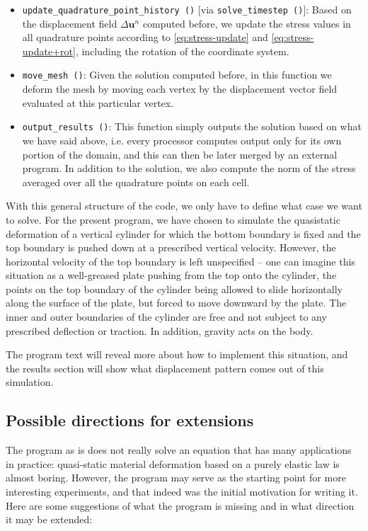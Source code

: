 \documentclass{article}
\renewcommand{\vec}[1]{\mathbf{#1}}
\begin{document}
\begin{itemize}
\item \texttt{update\_quadrature\_point\_history ()} [via
  \texttt{solve\_timestep ()}]: Based on the displacement field $\Delta \vec
  u^n$ computed before, we update the stress values in all quadrature points
  according to \eqref{eq:stress-update} and \eqref{eq:stress-update+rot},
  including the rotation of the coordinate system.

\item \texttt{move\_mesh ()}: Given the solution computed before, in this
  function we deform the mesh by moving each vertex by the displacement vector
  field evaluated at this particular vertex.

\item \texttt{output\_results ()}: This function simply outputs the solution
  based on what we have said above, i.e. every processor computes output only
  for its own portion of the domain, and this can then be later merged by an
  external program. In addition to the solution, we also compute the norm of
  the stress averaged over all the quadrature points on each cell.
\end{itemize}

With this general structure of the code, we only have to define what case we
want to solve. For the present program, we have chosen to simulate the
quasistatic deformation of a vertical cylinder for which the bottom boundary
is fixed and the top boundary is pushed down at a prescribed vertical
velocity. However, the horizontal velocity of the top boundary is left
unspecified -- one can imagine this situation as a well-greased plate pushing
from the top onto the cylinder, the points on the top boundary of the cylinder
being allowed to slide horizontally along the surface of the plate, but forced
to move downward by the plate. The inner and outer boundaries of the cylinder
are free and not subject to any prescribed deflection or traction. In
addition, gravity acts on the body.

The program text will reveal more about how to implement this situation, and
the results section will show what displacement pattern comes out of this
simulation. 

\subsection*{Possible directions for extensions}

The program as is does not really solve an equation that has many applications
in practice: quasi-static material deformation based on a purely elastic law
is almost boring. However, the program may serve as the starting point for
more interesting experiments, and that indeed was the initial motivation for
writing it. Here are some suggestions of what the program is missing and in
what direction it may be extended:
\end{document}
